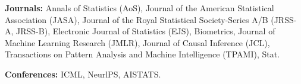 \documentclass{article}
\begin{document}
\vspace{2mm}
\noindent \textbf{Journals: }Annals of Statistics (AoS), Journal of the American Statistical Association (JASA), Journal of the Royal Statistical Society-Series A/B (JRSS-A, JRSS-B), Electronic Journal of Statistics (EJS), Biometrics, Journal of Machine Learning Research (JMLR), Journal of Causal Inference (JCL), Transactions on Pattern Analysis and Machine Intelligence (TPAMI), Stat. 

\vspace{2mm}
\noindent \textbf{Conferences:} ICML, NeurlPS, AISTATS.







\end{document}
